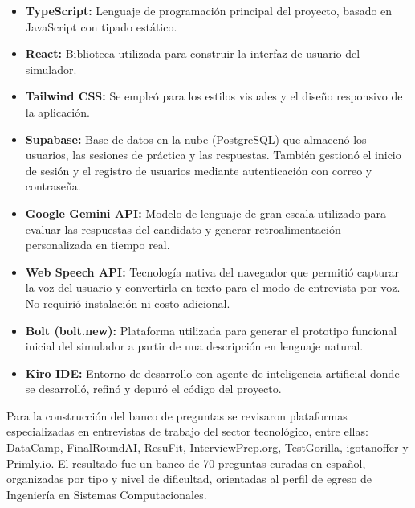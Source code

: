 \begin{itemize}
    \item \textbf{TypeScript:} Lenguaje de programación principal
    del proyecto, basado en JavaScript con tipado estático.

    \item \textbf{React:} Biblioteca utilizada para construir la
    interfaz de usuario del simulador.

    \item \textbf{Tailwind CSS:} Se empleó para los estilos visuales
    y el diseño responsivo de la aplicación.

    \item \textbf{Supabase:} Base de datos en la nube (PostgreSQL)
    que almacenó los usuarios, las sesiones de práctica y las
    respuestas. También gestionó el inicio de sesión y el registro
    de usuarios mediante autenticación con correo y contraseña.

    \item \textbf{Google Gemini API:} Modelo de lenguaje de gran
    escala utilizado para evaluar las respuestas del candidato y
    generar retroalimentación personalizada en tiempo real.

    \item \textbf{Web Speech API:} Tecnología nativa del navegador
    que permitió capturar la voz del usuario y convertirla en texto
    para el modo de entrevista por voz. No requirió instalación ni
    costo adicional.

    \item \textbf{Bolt (bolt.new):} Plataforma utilizada para generar
    el prototipo funcional inicial del simulador a partir de una
    descripción en lenguaje natural.

    \item \textbf{Kiro IDE:} Entorno de desarrollo con agente de
    inteligencia artificial donde se desarrolló, refinó y depuró
    el código del proyecto.
\end{itemize}

Para la construcción del banco de preguntas se revisaron plataformas
especializadas en entrevistas de trabajo del sector tecnológico,
entre ellas: DataCamp, FinalRoundAI, ResuFit, InterviewPrep.org,
TestGorilla, igotanoffer y Primly.io. El resultado fue un banco de
70 preguntas curadas en español, organizadas por tipo y nivel de
dificultad, orientadas al perfil de egreso de Ingeniería en Sistemas
Computacionales.

